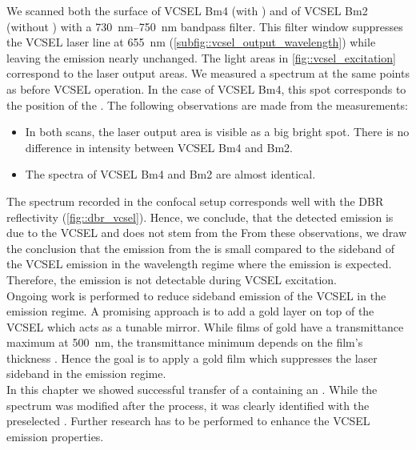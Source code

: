 	We scanned both the surface of VCSEL Bm4 (with \nd) and of VCSEL Bm2 (without \nd) with a \SIrange{730}{750}{nm} bandpass filter.
	This filter window suppresses the VCSEL laser line at \SI{655}{nm} (\ref{subfig::vcsel_output_wavelength}) while leaving the \siv emission nearly unchanged.
	The light areas in \cref{fig::vcsel_excitation} correspond to the laser output areas.
	We measured a spectrum at the same points as before VCSEL operation. 
	In the case of VCSEL Bm4, this spot corresponds to the position of the \siv.
	The following observations are made from the measurements:
	\begin{itemize}
		\item In both scans, the laser output area is visible as a big bright spot. There is no difference in intensity between VCSEL Bm4 and Bm2.
		\item The spectra of VCSEL Bm4 and Bm2 are almost identical.
	\end{itemize}
	
	The spectrum recorded in the confocal setup corresponds well with the DBR reflectivity (\cref{fig::dbr_vcsel}).
	Hence, we conclude, that the detected emission is due to the VCSEL and does not stem from the \siv{}
	From these observations, we draw the conclusion that the \fl emission from the \siv is small compared to the sideband of the VCSEL emission in the wavelength regime where the \siv emission is expected.
	Therefore, the \siv emission is not detectable during VCSEL excitation.
	\\
	Ongoing work is performed to reduce sideband emission of the VCSEL in the \siv emission regime.
	A promising approach is to add a gold layer on top of the VCSEL which acts as a tunable mirror.
	While films of gold have a transmittance maximum at \SI{500}{nm}, the transmittance minimum depends on the film's thickness \cite{Axelevitch2012}.
	Hence the goal is to apply a gold film which suppresses the laser sideband in the \siv emission regime.
	\\
	In this chapter we showed successful transfer of a \nd containing an \siv.
	While the \siv spectrum was modified after the \pp process, it was clearly identified with the preselected \siv.
	Further research has to be performed to enhance the VCSEL emission properties.

	